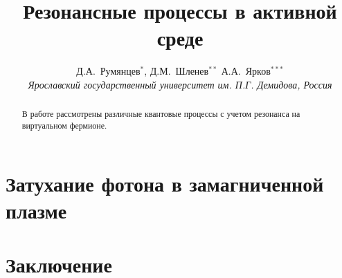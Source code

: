 \documentclass[12pt]{article}
\title{Резонансные процессы в активной среде}
\author{Д.А.~Румянцев$^{*}$, Д.М.~Шленев$^{**}$
А.А.~Ярков$^{***}$
\\
{\it Ярославский государственный университет им. П.Г. Демидова, Россия}}
\date{}
\begin{document}
\large
\maketitle
\def\abstractname{\empty}
\baselineskip=22pt

\begin{abstract}

\baselineskip=20pt

{\large В работе рассмотрены различные квантовые процессы с учетом резонанса на виртуальном фермионе.}
\end{abstract}

{\def\thefootnote{*}
\def\thefootnote{**}
\def\thefootnote{***}
}

\newpage
\unitlength 1mm




\label{Ch:WaveF}
\label{Ch:Propagator}

\label{Ch:Compton}



\section{Затухание фотона в замагниченной плазме}
\label{sec2.1}
\section{Заключение}

\newpage
%


\end{document}
